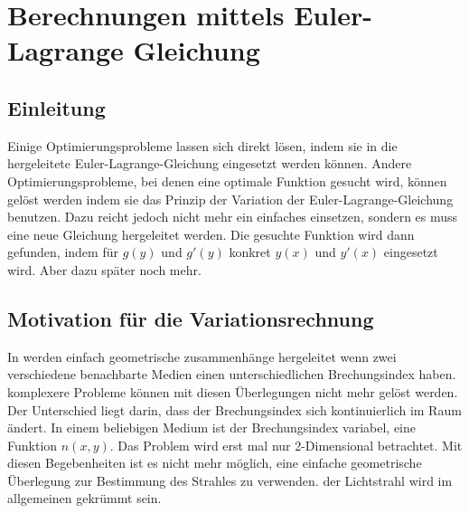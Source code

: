 \section{Berechnungen mittels Euler-Lagrange Gleichung}
\subsection{Einleitung}
Einige Optimierungsprobleme lassen sich direkt lösen, indem sie in die hergeleitete Euler-Lagrange-Gleichung eingesetzt werden können. Andere Optimierungsprobleme, bei denen eine optimale Funktion gesucht wird, können gelöst werden indem sie das Prinzip der Variation der Euler-Lagrange-Gleichung benutzen. Dazu reicht jedoch nicht mehr ein einfaches einsetzen, sondern es muss eine neue Gleichung hergeleitet werden. Die gesuchte Funktion wird dann gefunden, indem für $g(y)$ und $g'(y)$ konkret $y(x)$ und $y'(x)$ eingesetzt wird. Aber dazu später noch mehr.
\subsection{Motivation für die Variationsrechnung}
In  werden einfach geometrische zusammenhänge hergeleitet wenn zwei verschiedene benachbarte Medien einen unterschiedlichen Brechungsindex haben. komplexere Probleme können mit diesen Überlegungen nicht mehr gelöst werden. Der Unterschied liegt darin, dass der Brechungsindex sich kontinuierlich im Raum ändert. In   einem  beliebigen  Medium  ist  der Brechungsindex variabel, eine Funktion $n(x,y)$. Das  Problem wird erst mal nur 2-Dimensional betrachtet. Mit diesen Begebenheiten ist es nicht mehr möglich, eine einfache geometrische Überlegung  zur  Bestimmung  des  Strahles  zu verwenden. der Lichtstrahl wird im allgemeinen gekrümmt sein.
